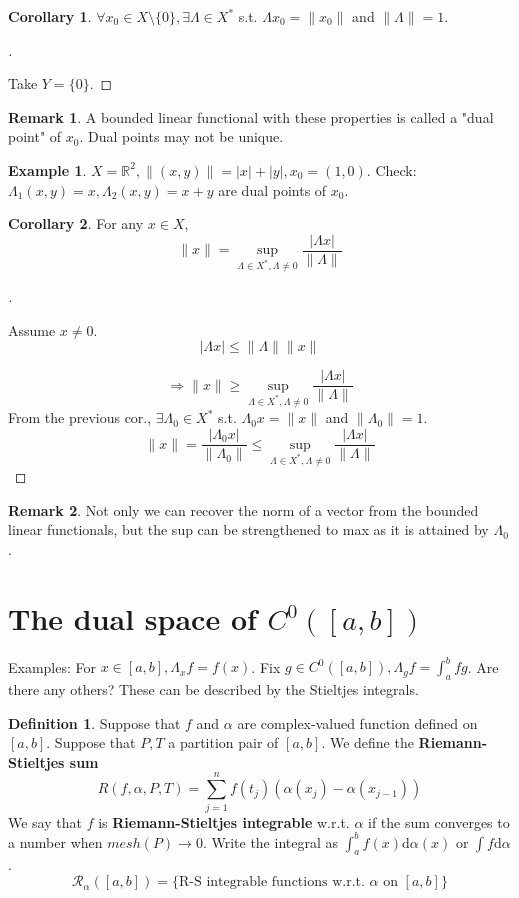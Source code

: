 \documentclass{article}
\theoremstyle{definition}
\newtheorem{ex}{Example}
\newtheorem{dfn}{Definition}
\newtheorem{rem}{Remark}
\newtheorem{cor}{Corollary}
\newenvironment{proofs}[1][\proofname]{%
  \begin{proof}[#1]$ $\par\nobreak\ignorespaces
}{%
  \end{proof}
}
\begin{document}
\begin{cor}
	$\forall x_0 \in X \setminus \{0\}, \exists \Lambda \in X^*$ s.t. $\Lambda x_0 = \|x_0 \|$ and $\|\Lambda\| =1$.
\end{cor}

\begin{proofs}
	Take $Y = \{0\}$.
\end{proofs}
\begin{rem}
	A bounded linear functional with these properties is called a "dual point" of $x_0$.
	Dual points may not be unique.
\end{rem}

\begin{ex}
	$X = \mathbb{R}^2, \|(x, y)\| = |x| + |y|, x_0 = (1, 0)$.
	Check: $\Lambda_1(x, y) = x, \Lambda_2(x, y) = x + y$ are dual points of $x_0$.
\end{ex}

\begin{cor}
	For any $x \in X$, 
	\[
		\|x\| = \sup_{\Lambda \in X^*, \Lambda \neq 0} \frac{|\Lambda x|}{\|\Lambda\|}
	\]
\end{cor}

\begin{proofs}
	Assume $x \neq 0$.
	\[
		|\Lambda x| \leq \| \Lambda \| \|x \|
	\]
	
	\[
		\Rightarrow \|x \| \geq \sup_{\Lambda \in X^*, \Lambda \neq 0} \frac{|\Lambda x|}{\|\Lambda \|}
	\]
	From the previous cor., $\exists \Lambda_0 \in X^*$ s.t. $\Lambda_0 x = \|x\|$ and $\|\Lambda_0\| = 1$.
	\[
		\|x\| = \frac{|\Lambda_0 x|}{\|\Lambda_0\|} \leq \sup_{\Lambda \in X^*, \Lambda \neq 0} \frac{|\Lambda x|}{\|\Lambda\|}
	\]
\end{proofs}

\begin{rem}
	Not only we can recover the norm of a vector from the bounded linear functionals, but the sup can be strengthened to max as it is attained by $\Lambda_0$.
\end{rem}


\section{The dual space of $C^0([a, b])$}


\par Examples: For $x \in [a, b], \Lambda_x f = f(x)$.
Fix $g \in C^0([a, b]), \Lambda_g f = \int_a^b fg$.
Are there any others?
These can be described by the Stieltjes integrals.

\begin{dfn}
	Suppose that $f$ and $\alpha$ are complex-valued function defined on $[a, b]$.
	Suppose that $P, T$ a partition pair of $[a, b]$.
	We define the \textbf{Riemann-Stieltjes sum}
	\[
		R(f, \alpha, P, T) = \sum_{j = 1}^n f(t_j) (\alpha (x_j) - \alpha(x_{j - 1}))
	\]
	We say that $f$ is \textbf{Riemann-Stieltjes integrable} w.r.t. $\alpha$ if the sum converges to a number when $mesh(P) \to 0$.
	Write the integral as $\int_a^b f(x) \mathrm{d} \alpha(x)$ or $\int f \mathrm{d} \alpha$.
	\[
		\mathcal{R}_\alpha([a, b]) = \{\text{R-S integrable functions w.r.t. }\alpha \text{ on } [a, b] \}
	\]
\end{dfn}
\end{document}
